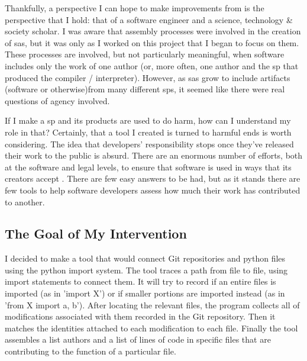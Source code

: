\documentclass[a4paper,man,natbib,floatsintext]{apa6}
\begin{document}

  Thankfully, a perspective I can hope to make improvements from is the perspective that I hold: that of a software engineer and a science, technology \& society scholar. I was aware that assembly processes were involved in the creation of \glspl{sa}, but it was only as I worked on this project that I began to focus on them. These processes are involved, but not particularly meaningful, when software includes only the work of one author (or, more often, one author and the \gls{sp} that produced the compiler / interpreter). However, as \glspl{sa} grow to include artifacts (software or otherwise)from many different \glspl{sp}, it seemed like there were real questions of agency involved. 

  If I make a \gls{sp} and its products are used to do harm, how can I understand my role in that? Certainly, that a tool I created is turned to harmful ends is worth considering. The idea that developers' responsibility stops once they've released their work to the public is absurd. There are an enormous number of efforts, both at the software and legal levels, to ensure that software is used in ways that its creators accept \citep{Gabriella_Coleman2012-lq,Kelty2008-jm}. There are few easy answers to be had, but as it stands there are few tools to help software developers assess how much their work has contributed to another. 

  \subsection{The Goal of My Intervention}
  I decided to make a tool that would connect Git repositories and \Gls{python} files using the \Gls{python} import system. The tool traces a path from file to file, using import statements to connect them. It will try to record if an entire files is imported (as in 'import X') or if smaller portions are imported instead (as in 'from X import a, b'). After locating the relevant files, the program collects all of modifications associated with them recorded in the Git repository. Then it matches the identities attached to each modification to each file. Finally the tool assembles a list authors and a list of lines of code in specific files that are contributing to the function of a particular file.
\end{document}
